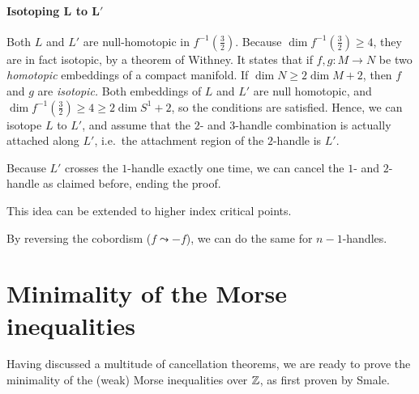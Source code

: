 \begin{myproof}
    \paragraph{Isotoping $\bm{L}$ to $\bm{L'}$}
    Both $L$ and $L'$ are null-homotopic in  $f^{-1}(\frac{3}{2})$.
    Because $\dim f^{-1}(\frac{3}{2}) \ge 4$, they are in fact isotopic, by a theorem of Withney.
    It states that if $f, g: M \to N$ be two \emph{homotopic} embeddings of a compact manifold. If $\dim N \ge  2 \dim M + 2$, then $f$ and  $g$ are \emph{isotopic.}
    Both embeddings of $L$ and  $L'$ are null homotopic, and  $\dim f^{-1}(\frac{3}{2}) \ge 4 \ge  2 \dim S^{1} +  2$, so the conditions are satisfied.
    Hence, we can isotope $L$ to $L'$, and assume that the $2$- and  $3$-handle combination is actually attached along $L'$, i.e.\ the attachment region of the $2$-handle is $L'$.

    Because $L'$ crosses the  $1$-handle exactly one time, we can cancel the $1$- and $2$-handle as claimed before, ending the proof.
\end{myproof}
\begin{remark}
    This idea can be extended to higher index critical points.
\end{remark}
\begin{remark}
    By reversing the cobordism ($f \leadsto -f$), we can do the same for $n-1$-handles.
\end{remark}

\section{Minimality of the Morse inequalities}
\label{sec:minimality}

Having discussed a multitude of cancellation theorems, we are ready to prove the minimality of the (weak) Morse inequalities over $\mathbb{Z}$, as first proven by Smale.

